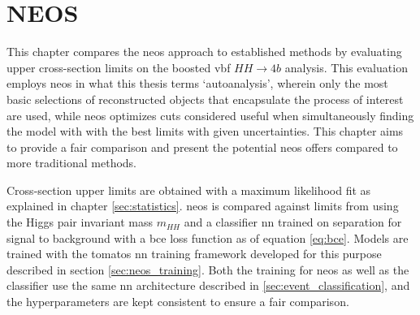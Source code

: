 \chapter{NEOS}











This chapter compares the \ac{neos} approach to established methods by evaluating upper cross-section limits on the boosted \ac{vbf} $HH\rightarrow4b$ analysis. This evaluation employs \ac{neos} in what this thesis terms `autoanalysis', wherein only the most basic selections of reconstructed objects that encapsulate the process of interest are used, while \ac{neos} optimizes cuts considered useful when simultaneously finding the model with with the best limits with given uncertainties. This chapter aims to provide a fair comparison and present the potential \ac{neos} offers compared to more traditional methods.

Cross-section upper limits are obtained with a maximum likelihood fit as explained in chapter \ref{sec:statistics}. \ac{neos} is compared against limits from using the Higgs pair invariant mass $m_{HH}$ and a classifier \ac{nn} trained on separation for signal to background with a \ac{bce} loss function as of equation \ref{eq:bce}. Models are trained with the \ac{tomatos} \ac{nn} training framework developed for this purpose \citep{tomatos} described in section \ref{sec:neos_training}. Both the training for \ac{neos} as well as the classifier use the same \ac{nn} architecture described in \ref{sec:event_classification}, and the hyperparameters are kept consistent to ensure a fair comparison.

